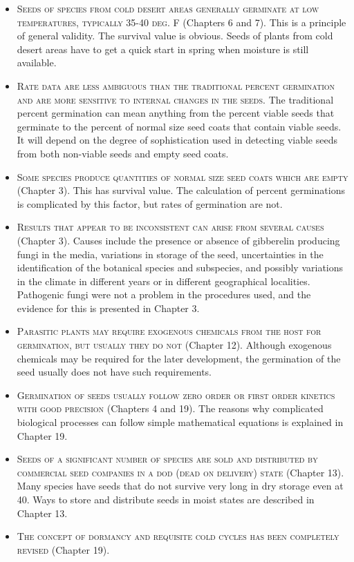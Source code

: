 \begin{itemize}
\item \textsc{Seeds of species from cold desert areas
generally germinate at low temperatures, typically 35-40
deg. F} (Chapters 6 and 7). This is a principle of general validity. The survival value
is obvious. Seeds of plants from cold desert areas have to get a quick start in spring
when moisture is still available.

\item \textsc{Rate data are less ambiguous than the traditional
percent germination and are more sensitive to internal
changes in the seeds.} The traditional percent germination can mean
anything from the percent viable seeds that germinate to the percent of normal size
seed coats that contain viable seeds. It will depend on the degree of sophistication
used in detecting viable seeds from both non-viable seeds and empty seed coats.

\item \textsc{Some species produce quantities of normal size seed coats which are empty}
(Chapter 3). This has survival value. The calculation of percent germinations
is complicated by this factor, but rates of germination are not.

\item \textsc{Results that appear to be inconsistent can arise
from several causes} (Chapter 3). Causes include the presence or absence
of gibberelin producing fungi in the media, variations in storage of the seed,
uncertainties in the identification of the botanical species and subspecies, and
possibly variations in the climate in different years or in different geographical
localities. Pathogenic fungi were not a problem in the procedures used, and the
evidence for this is presented in Chapter 3.

\item \textsc{Parasitic plants may require exogenous
chemicals from the host for germination, but usually they
do not} (Chapter 12). Although exogenous chemicals may be required for the later
development, the germination of the seed usually does not have such requirements.

\item \textsc{Germination of seeds usually follow zero order
or first order kinetics with good precision} (Chapters 4 and 19).
The reasons why complicated biological processes can follow simple mathematical
equations is explained in Chapter 19.

\item \textsc{Seeds of a significant number of species are sold
and distributed by commercial seed companies in a dod
(dead on delivery) state} (Chapter 13). Many species have seeds that do
not survive very long in dry storage even at 40. Ways to store and distribute seeds in
moist states are described in Chapter 13.

\item \textsc{The concept of dormancy and requisite cold
cycles has been completely revised} (Chapter 19).
\end{itemize}

